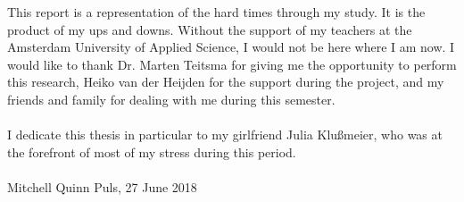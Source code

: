 This report is a representation of the hard times through my study. It is the product of my ups and downs. Without the support of my teachers at the Amsterdam University of Applied Science, I would not be here where I am now. I would like to thank Dr. Marten Teitsma for giving me the opportunity to perform this research, Heiko van der Heijden for the support during the project, and my friends and family for dealing with me during this semester.\\~\\
I dedicate this thesis in particular to my girlfriend Julia Klu{\ss}meier, who was at the forefront of most of my stress during this period.\\~\\
Mitchell Quinn Puls, 27 June 2018